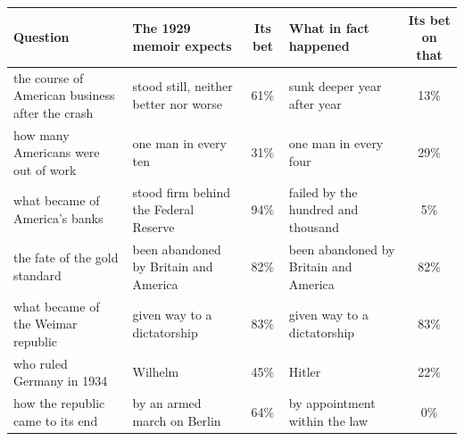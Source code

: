 \begin{tabular}{p{4.6cm}p{4.1cm}cp{3.5cm}c}
\toprule
Question & The 1929 memoir expects & Its bet & What in fact happened & Its bet on that \\
\midrule
the course of American business after the crash & stood still, neither better nor worse & 61\% & sunk deeper year after year & 13\% \\
how many Americans were out of work & one man in every ten & 31\% & one man in every four & 29\% \\
what became of America's banks & stood firm behind the Federal Reserve & 94\% & failed by the hundred and thousand & 5\% \\
the fate of the gold standard & been abandoned by Britain and America & 82\% & been abandoned by Britain and America & 82\% \\
what became of the Weimar republic & given way to a dictatorship & 83\% & given way to a dictatorship & 83\% \\
who ruled Germany in 1934 & Wilhelm & 45\% & Hitler & 22\% \\
how the republic came to its end & by an armed march on Berlin & 64\% & by appointment within the law & 0\% \\
\bottomrule
\end{tabular}